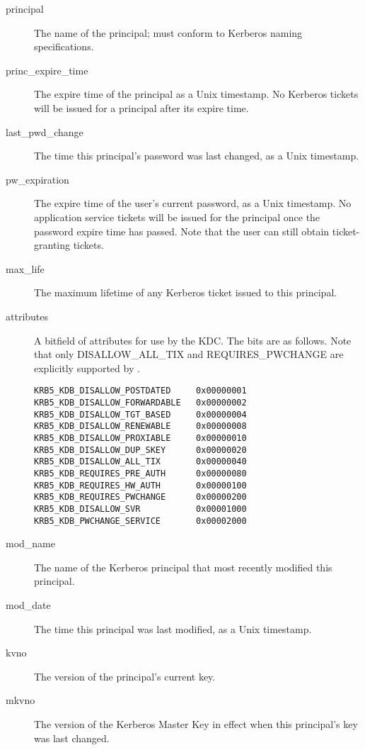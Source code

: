 \begin{description}
\item[principal] The name of the principal; must conform to Kerberos
naming specifications.

\item[princ_expire_time] The expire time of the principal as a Unix
timestamp.  No Kerberos tickets will be issued for a principal after
its expire time.

\item[last_pwd_change] The time this principal's password was last
changed, as a Unix timestamp.

\item[pw_expiration] The expire time of the user's current password, as a
Unix timestamp.  No application service tickets will be issued for the
principal once the password expire time has passed.  Note that the
user can still obtain ticket-granting tickets.

\item[max_life] The maximum lifetime of any Kerberos ticket issued to
this principal.

\item[attributes] A bitfield of attributes for use by the KDC.  The
bits are as follows.  Note that only DISALLOW_ALL_TIX and
REQUIRES_PWCHANGE are explicitly supported by \secure{}.

\begin{verbatim}
KRB5_KDB_DISALLOW_POSTDATED     0x00000001
KRB5_KDB_DISALLOW_FORWARDABLE   0x00000002
KRB5_KDB_DISALLOW_TGT_BASED     0x00000004
KRB5_KDB_DISALLOW_RENEWABLE     0x00000008
KRB5_KDB_DISALLOW_PROXIABLE     0x00000010
KRB5_KDB_DISALLOW_DUP_SKEY      0x00000020
KRB5_KDB_DISALLOW_ALL_TIX       0x00000040
KRB5_KDB_REQUIRES_PRE_AUTH      0x00000080
KRB5_KDB_REQUIRES_HW_AUTH       0x00000100
KRB5_KDB_REQUIRES_PWCHANGE      0x00000200
KRB5_KDB_DISALLOW_SVR           0x00001000
KRB5_KDB_PWCHANGE_SERVICE       0x00002000
\end{verbatim}

\item[mod_name] The name of the Kerberos principal that most recently
modified this principal.

\item[mod_date] The time this principal was last modified, as a Unix
timestamp.

\item[kvno] The version of the principal's current key.

\item[mkvno] The version of the Kerberos Master Key in effect when
this principal's key was last changed.


\end{description}
